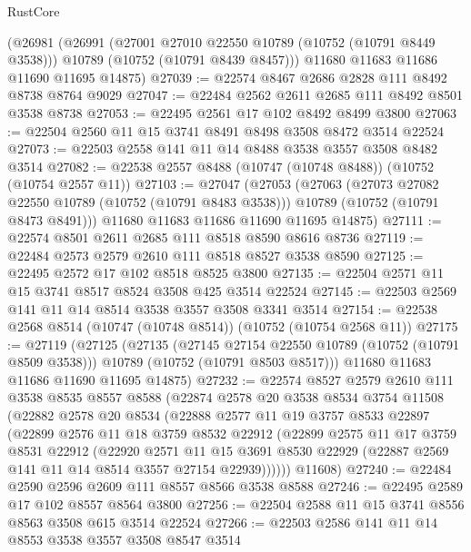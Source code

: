 \begin{lexlean}{RustCore}
\begin{coremodule}
    (@26981
      (@26991
        (@27001 @27010 @22550 @10789 (@10752 (@10791 @8449 @3538)))
        @10789
        (@10752 (@10791 @8439 @8457)))
      @11680
      @11683
      @11686
      @11690
      @11695
      @14875)
@27039 := @22574 @8467 @2686 @2828 @111 @8492 @8738 @8764 @9029
@27047 := @22484 @2562 @2611 @2685 @111 @8492 @8501 @3538 @8738
@27053 := @22495 @2561 @17 @102 @8492 @8499 @3800
@27063 := @22504 @2560 @11 @15 @3741 @8491 @8498 @3508 @8472 @3514 @22524
@27073 := @22503 @2558 @141 @11 @14 @8488 @3538 @3557 @3508 @8482 @3514
@27082 := @22538 @2557 @8488 (@10747 (@10748 @8488)) (@10752 (@10754 @2557 @11))
@27103 := @27047
    (@27053
      (@27063
        (@27073 @27082 @22550 @10789 (@10752 (@10791 @8483 @3538)))
        @10789
        (@10752 (@10791 @8473 @8491)))
      @11680
      @11683
      @11686
      @11690
      @11695
      @14875)
@27111 := @22574 @8501 @2611 @2685 @111 @8518 @8590 @8616 @8736
@27119 := @22484 @2573 @2579 @2610 @111 @8518 @8527 @3538 @8590
@27125 := @22495 @2572 @17 @102 @8518 @8525 @3800
@27135 := @22504 @2571 @11 @15 @3741 @8517 @8524 @3508 @425 @3514 @22524
@27145 := @22503 @2569 @141 @11 @14 @8514 @3538 @3557 @3508 @3341 @3514
@27154 := @22538 @2568 @8514 (@10747 (@10748 @8514)) (@10752 (@10754 @2568 @11))
@27175 := @27119
    (@27125
      (@27135
        (@27145 @27154 @22550 @10789 (@10752 (@10791 @8509 @3538)))
        @10789
        (@10752 (@10791 @8503 @8517)))
      @11680
      @11683
      @11686
      @11690
      @11695
      @14875)
@27232 := @22574
    @8527
    @2579
    @2610
    @111
    @3538
    @8535
    @8557
    @8588
    (@22874
      @2578
      @20
      @3538
      @8534
      @3754
      @11508
      (@22882
        @2578
        @20
        @8534
        (@22888
          @2577
          @11
          @19
          @3757
          @8533
          @22897
          (@22899
            @2576
            @11
            @18
            @3759
            @8532
            @22912
            (@22899
              @2575
              @11
              @17
              @3759
              @8531
              @22912
              (@22920
                @2571
                @11
                @15
                @3691
                @8530
                @22929
                (@22887 @2569 @141 @11 @14 @8514 @3557 @27154 @22939))))))
      @11608)
@27240 := @22484 @2590 @2596 @2609 @111 @8557 @8566 @3538 @8588
@27246 := @22495 @2589 @17 @102 @8557 @8564 @3800
@27256 := @22504 @2588 @11 @15 @3741 @8556 @8563 @3508 @615 @3514 @22524
@27266 := @22503 @2586 @141 @11 @14 @8553 @3538 @3557 @3508 @8547 @3514

\end{coremodule}
\end{lexlean}
